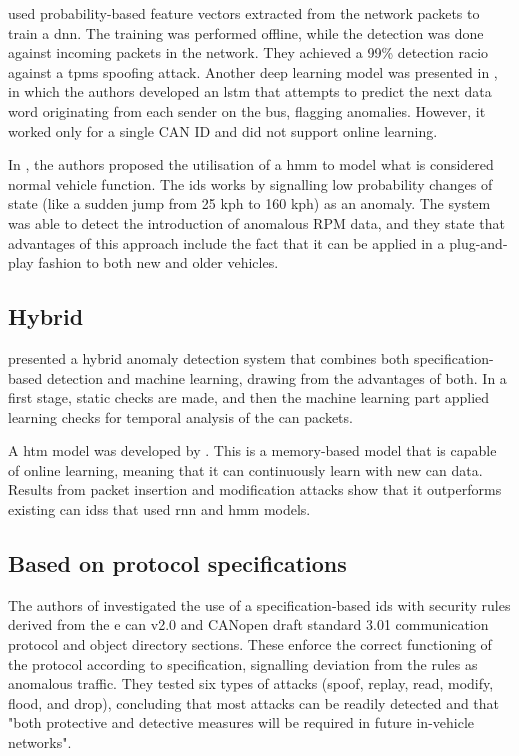\cite{kang2016intrusion} used probability-based feature vectors extracted from the network packets to train a \acrlong{dnn}. The training was performed offline, while the detection was done against incoming packets in the network. They achieved a 99\% detection racio against a \gls{tpms} spoofing attack. Another deep learning model was presented in \cite{Taylor2016}, in which the authors developed an \gls{lstm} that attempts to predict the next data word originating from each sender on the bus, flagging anomalies. However, it worked only for a single CAN ID and did not support online learning.\par
In \cite{narayanan2016obd_securealert}, the authors proposed the utilisation of a \gls{hmm} to model what is considered normal vehicle function. The \gls{ids} works by signalling low probability changes of state (like a sudden jump from 25 kph to 160 kph) as an anomaly. The system was able to detect the introduction of anomalous RPM data, and they state that advantages of this approach include the fact that it can be applied in a plug-and-play fashion to both new and older vehicles.

\subsection{Hybrid}

\cite{weber2018embedded} presented a hybrid anomaly detection system that combines both specification-based detection and machine learning, drawing from the advantages of both. In a first stage, static checks are made, and then the machine learning part applied learning checks for temporal analysis of the \gls{can} packets.\par
A \gls{htm} model was developed by \cite{wang2018distributed}. This is a memory-based model that is capable of online learning, meaning that it can continuously learn with new \gls{can} data. Results from packet insertion and modification attacks show that it outperforms existing \gls{can} \glspl{ids} that used \gls{rnn} and \gls{hmm} models.

\subsection{Based on protocol specifications}

The authors of \cite{larson2008approach} investigated the use of a specification-based \gls{ids} with security rules derived from the e \gls{can} v2.0 and CANopen draft standard 3.01 communication protocol and object directory sections. These enforce the correct functioning of the protocol according to specification, signalling deviation from the rules as anomalous traffic. They tested six types of attacks (spoof, replay, read, modify, flood, and drop), concluding that most attacks can be readily detected and that "both protective and detective measures will be required in future in-vehicle networks".

